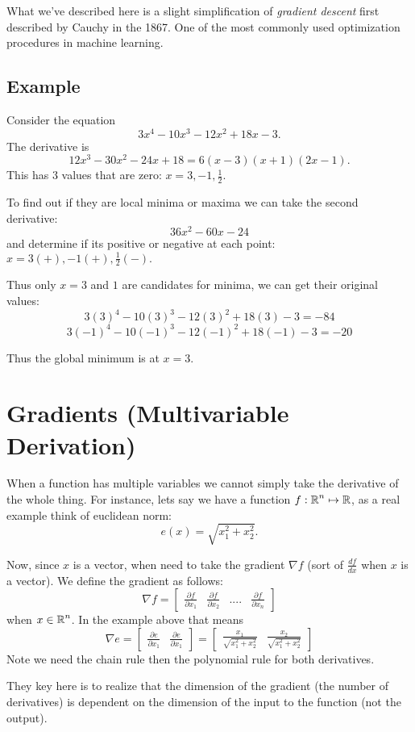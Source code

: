 What we've described here is a slight simplification of \emph{gradient descent} first described by Cauchy in the 1867. 
One of the most commonly used optimization procedures in machine learning. 

\subsection{Example}
Consider the equation \[3x^4-10x^3-12x^2+18x-3.\]
The derivative is \[12x^3-30x^2-24x+18=6(x-3)(x+1)(2x-1).\]
This has 3 values that are zero: $x=3,-1,\frac{1}{2}.$


To find out if they are local minima or maxima we can take the second derivative: 
\[36x^2-60x-24\] 
and determine if its positive or negative at each point: 
$x=3 (+),-1 (+),\frac{1}{2}(-).$

Thus only $x=3$ and $1$ are candidates for minima, 
we can get their original values:
\[3(3)^4-10(3)^3-12(3)^2+18(3)-3=-84\]
\[3(-1)^4-10(-1)^3-12(-1)^2+18(-1)-3=-20\]

Thus the global minimum is at $x=3$.
\section{Gradients (Multivariable Derivation)}
When a function has multiple variables we cannot simply take the derivative of the whole thing. 
For instance, lets say we have a function $f:\operatorname{\mathbb{R}}^n\mapsto\operatorname{\mathbb{R}}$, 
as a real example think of euclidean norm: 
\[e(x) = \sqrt{x_1^2+x_2^2}.\]

Now, since $x$ is a vector, when need to take the gradient $\nabla f$ (sort of $\frac{df}{dx}$ when $x$ is a vector). 
We define the gradient as follows:
\[\nabla f = \begin{bmatrix}\frac{\partial f}{\partial x_1}&\frac{\partial f}{\partial x_2}&....&\frac{\partial f}{\partial x_n}\end{bmatrix}\]
when $x\in\operatorname{\mathbb{R}}^n$. 
In the example above that means 
\[\nabla e = \begin{bmatrix}\frac{\partial e}{\partial x_1}&\frac{\partial e}{\partial x_1}\end{bmatrix}= \begin{bmatrix}\frac{x_1}{ \sqrt{x_1^2+x_2^2}}&\frac{x_2}{\sqrt{x_1^2+x_2^2}}\end{bmatrix}\]
Note we need the chain rule then the polynomial rule for both derivatives. 

They key here is to realize that the dimension of the gradient (the number of derivatives) 
is dependent on the dimension of the input to the function (not the output).



